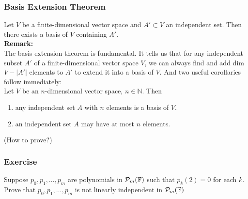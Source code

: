 \documentclass[12pt, t]{beamer}
\newcommand{\N}{\mathbb{N}}
\newcommand{\nullspace}{~\\[15pt]}
\newcommand{\remark}{\textbf{Remark: }}
\begin{document}
\begin{frame}
    \frametitle{Basis Extension Theorem}
    Let $V$ be a finite-dimensional vector space and $A'\subset V$ an independent set. Then there exists a basis of $V$ containing $A'$.
    \nullspace
    \remark\\
    The basis extension theorem is fundamental. It tells us that for any independent subset $A'$ of a finite-dimensional vector space $V$, we can always find and add dim $V-|A'|$ elements to $A'$ to extend it into a basis of $V$. And two useful corollaries follow immediately:\nullspace
    Let $V$ be an $n$-dimensional vector space, $n\in\N$. Then\\
    \begin{enumerate}
        \item any independent set $A$ with $n$ elements is a basis of $V$.
        \item an independent set $A$ may have at most $n$ elements.
    \end{enumerate}
    (How to prove?)
\end{frame}

\begin{frame}
    \frametitle{Exercise}
    Suppose $p_{0}, p_{1}, \ldots, p_{m}$ are polynomials in $\mathcal{P}_{m}(\mathbb{F})$ such that $p_{k}(2)=0$ for each $k.$ Prove that $p_{0}, p_{1}, \ldots, p_{m}$ is not linearly independent in $\mathcal{P}_{m}(\mathbb{F})$


\end{frame}
\end{document}
